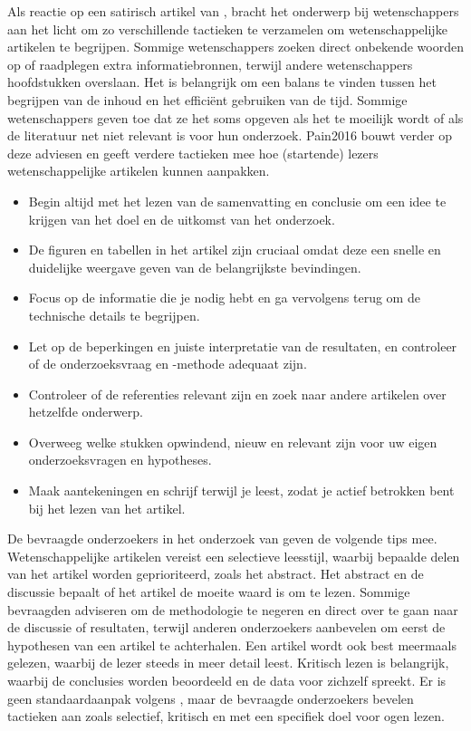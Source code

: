 Als reactie op een satirisch artikel van \textcite{Ruben2016}, bracht \textcite{Pain2016} het onderwerp bij wetenschappers aan het licht om zo verschillende tactieken te verzamelen om wetenschappelijke artikelen te begrijpen. Sommige wetenschappers zoeken direct onbekende woorden op of raadplegen extra informatiebronnen, terwijl andere wetenschappers hoofdstukken overslaan. Het is belangrijk om een balans te vinden tussen het begrijpen van de inhoud en het efficiënt gebruiken van de tijd. Sommige wetenschappers geven toe dat ze het soms opgeven als het te moeilijk wordt of als de literatuur net niet relevant is voor hun onderzoek. {Pain2016} bouwt verder op deze adviesen en geeft verdere tactieken mee hoe (startende) lezers wetenschappelijke artikelen kunnen aanpakken.

\begin{itemize}
	\item Begin altijd met het lezen van de samenvatting en conclusie om een idee te krijgen van het doel en de uitkomst van het onderzoek.
	\item De figuren en tabellen in het artikel zijn cruciaal omdat deze een snelle en duidelijke weergave geven van de belangrijkste bevindingen.
	\item Focus op de informatie die je nodig hebt en ga vervolgens terug om de technische details te begrijpen.
	\item Let op de beperkingen en juiste interpretatie van de resultaten, en controleer of de onderzoeksvraag en -methode adequaat zijn.
	\item Controleer of de referenties relevant zijn en zoek naar andere artikelen over hetzelfde onderwerp.
	\item Overweeg welke stukken opwindend, nieuw en relevant zijn voor uw eigen onderzoeksvragen en hypotheses.
	\item Maak aantekeningen en schrijf terwijl je leest, zodat je actief betrokken bent bij het lezen van het artikel.
\end{itemize}

De bevraagde onderzoekers in het onderzoek van \textcite{Hubbard2017} geven de volgende tips mee. Wetenschappelijke artikelen vereist een selectieve leesstijl, waarbij bepaalde delen van het artikel worden geprioriteerd, zoals het abstract. Het abstract en de discussie bepaalt of het artikel de moeite waard is om te lezen. Sommige bevraagden adviseren om de methodologie te negeren en direct over te gaan naar de discussie of resultaten, terwijl anderen onderzoekers aanbevelen om eerst de hypothesen van een artikel te achterhalen. Een artikel wordt ook best meermaals gelezen, waarbij de lezer steeds in meer detail leest. Kritisch lezen is belangrijk, waarbij de conclusies worden beoordeeld en de data voor zichzelf spreekt. Er is geen standaardaanpak volgens \textcite{Hubbard2017}, maar de bevraagde onderzoekers bevelen tactieken aan zoals selectief, kritisch en met een specifiek doel voor ogen lezen.


